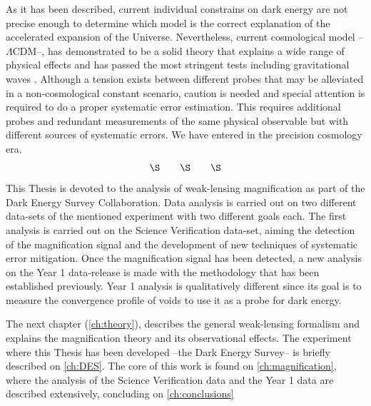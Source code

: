 As it has been described, current individual constrains on dark energy are not precise enough to determine which model is the correct explanation of the accelerated expansion of the Universe. Nevertheless, current cosmological model --$\Lambda$CDM--, has demonstrated to be a solid theory that explains a wide range of physical effects and has passed the most stringent tests including gravitational waves \cite{1982ApJ...253..908T,PhysRevLett.116.061102}. Although a tension exists between different probes that may be alleviated in a  non-cosmological constant scenario, caution is needed and special attention is required to do a proper systematic error estimation. This requires additional probes and redundant measurements of the same physical observable but with different sources of systematic errors. We have entered in the precision cosmology era.
$$\S\qquad \S\qquad \S$$
This Thesis is devoted to the analysis of weak-lensing magnification as part of the Dark Energy Survey Collaboration. Data analysis is carried out on two different data-sets of the mentioned experiment with two different goals each. The first analysis is carried out on the Science Verification data-set, aiming the detection of the magnification signal and the development of new techniques of systematic error mitigation. Once the magnification signal has been detected, a new analysis on the Year 1 data-release is made with the methodology that has been established previously. Year 1 analysis is qualitatively different since its goal is to measure the convergence profile of voids to use it as a probe for dark energy.
\newline

The next chapter (\autoref{ch:theory}), describes the general weak-lensing formalism and explains the magnification theory and its observational effects. The experiment where this Thesis has been developed --the Dark Energy Survey-- is briefly described on \autoref{ch:DES}. The core of this work is found on \autoref{ch:magnification}, where the analysis of the Science Verification data and the Year 1 data are described extensively, concluding on \autoref{ch:conclusions}
